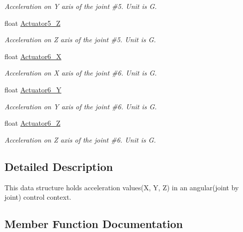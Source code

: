 \begin{DoxyCompactItemize}
\begin{DoxyCompactList}\small\item\em Acceleration on Y axis of the joint \#5. Unit is G. \end{DoxyCompactList}\item 
float \hyperlink{structAngularAcceleration_a9ba585569c14f9dec730713ad92cd25d}{Actuator5\+\_\+Z}
\begin{DoxyCompactList}\small\item\em Acceleration on Z axis of the joint \#5. Unit is G. \end{DoxyCompactList}\item 
float \hyperlink{structAngularAcceleration_a285c6634d7542d3feaffcc6cc610db05}{Actuator6\+\_\+X}
\begin{DoxyCompactList}\small\item\em Acceleration on X axis of the joint \#6. Unit is G. \end{DoxyCompactList}\item 
float \hyperlink{structAngularAcceleration_a1f227cd43faadf267dde95ec75392311}{Actuator6\+\_\+Y}
\begin{DoxyCompactList}\small\item\em Acceleration on Y axis of the joint \#6. Unit is G. \end{DoxyCompactList}\item 
float \hyperlink{structAngularAcceleration_a22ce9847bc5c4aee829b734081e944fd}{Actuator6\+\_\+Z}
\begin{DoxyCompactList}\small\item\em Acceleration on Z axis of the joint \#6. Unit is G. \end{DoxyCompactList}\end{DoxyCompactItemize}


\subsection{Detailed Description}
This data structure holds acceleration values(\+X, Y, Z) in an angular(joint by joint) control context. 

\subsection{Member Function Documentation}
